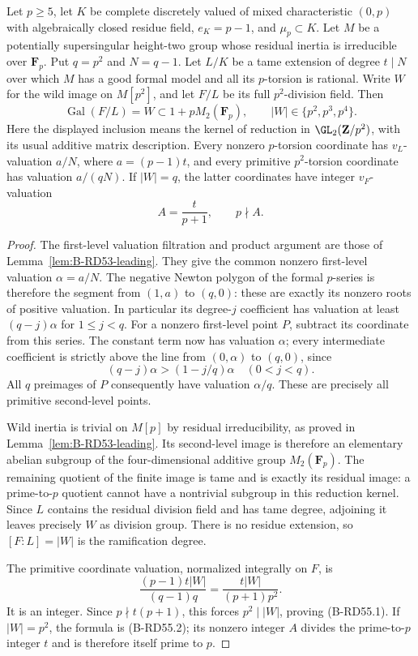 \begin{lemma}
\label{lem:B-RD55-valuations}
Let $p\ge5$, let $K$ be complete discretely valued of mixed
characteristic $(0,p)$ with algebraically closed residue field,
$e_K=p-1$, and $\mu_p\subset K$. Let $M$ be a potentially
supersingular height-two group whose residual inertia is
irreducible over $\mathbf F_p$. Put $q=p^2$ and $N=q-1$.
Let $L/K$ be a tame extension of degree $t\mid N$ over which
$M$ has a good formal model and all its $p$-torsion is rational.
Write $W$ for the wild image on $M[p^2]$, and let $F/L$ be
its full $p^2$-division field. Then
\[
       \operatorname{Gal}(F/L)=W\subset1+pM_2(\mathbf F_p),
       \qquad |W|\in\{p^2,p^3,p^4\}.                 \tag{B-RD55.1}
\]
Here the displayed inclusion means the kernel of reduction in
$\GL_2(\mathbf Z/p^2)$, with its usual additive matrix description.
Every nonzero $p$-torsion coordinate has $v_L$-valuation
$a/N$, where $a=(p-1)t$, and every primitive $p^2$-torsion
coordinate has valuation $a/(qN)$.
If $|W|=q$, the latter coordinates have integer $v_F$-valuation
\[
                         A=\frac{t}{p+1},\qquad p\nmid A.
                                                        \tag{B-RD55.2}
\]
\end{lemma}
\begin{proof}
The first-level valuation filtration and product argument are
those of Lemma~\ref{lem:B-RD53-leading}. They give the common
nonzero first-level valuation $\alpha=a/N$.
The negative Newton polygon of the formal $p$-series is therefore
the segment from $(1,a)$ to $(q,0)$: these are exactly its
nonzero roots of positive valuation. In particular its degree-$j$
coefficient has valuation at least $(q-j)\alpha$ for $1\le j<q$.
For a nonzero first-level point $P$, subtract its coordinate
from this series. The constant term now has valuation $\alpha$;
every intermediate coefficient is strictly above the line
from $(0,\alpha)$ to $(q,0)$, since
\[
               (q-j)\alpha>(1-j/q)\alpha\quad(0<j<q).
\]
All $q$ preimages of $P$ consequently have valuation
$\alpha/q$. These are precisely all primitive second-level points.

Wild inertia is trivial on $M[p]$ by residual irreducibility,
as proved in Lemma~\ref{lem:B-RD53-leading}. Its second-level
image is therefore an elementary abelian subgroup of the
four-dimensional additive group $M_2(\mathbf F_p)$.
The remaining quotient of the finite image is tame and is
exactly its residual image: a prime-to-$p$ quotient cannot
have a nontrivial subgroup in this reduction kernel.
Since $L$ contains the residual division field and has tame
degree, adjoining it leaves precisely $W$ as division group.
There is no residue extension, so $[F:L]=|W|$ is the
ramification degree.

The primitive coordinate valuation, normalized integrally on
$F$, is
\[
             \frac{(p-1)t|W|}{(q-1)q}
                  =\frac{t|W|}{(p+1)p^2}.
\]
It is an integer. Since $p\nmid t(p+1)$, this forces
$p^2\mid |W|$, proving (B-RD55.1). If $|W|=p^2$, the formula
is (B-RD55.2); its nonzero integer $A$ divides the prime-to-$p$
integer $t$ and is therefore itself prime to $p$.
\end{proof}

